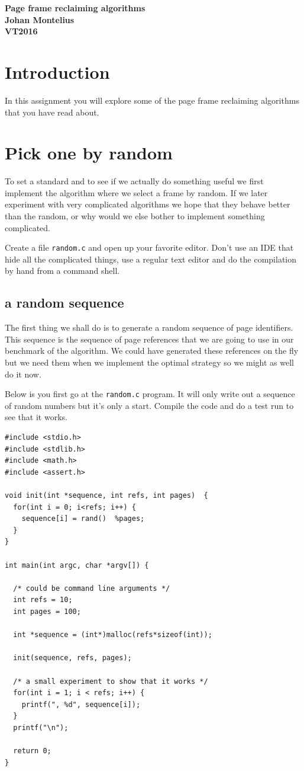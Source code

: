 \documentclass[a4paper,11pt]{article}
\newcommand{\nnsection}[1]{
\section*{#1} \addcontentsline{toc}{section}{#1} }
\begin{document}
\begin{center} \vspace{20pt} \textbf{\large Page frame reclaiming algorithms}\\
\vspace{10pt} \textbf{Johan Montelius}\\ \vspace{10pt} \textbf{VT2016}
\end{center}

\nnsection{Introduction}

In this assignment you will explore some of the page frame reclaiming
algorithms that you have read about.

\section{Pick one by random}

To set a standard and to see if we actually do something useful we
first implement the algorithm where we select a frame by random. If we
later experiment with very complicated algorithms we hope that they
behave better than the random, or why would we else bother to implement
something complicated.

Create a file {\tt random.c} and open up your favorite editor. Don't
use an IDE that hide all the complicated things, use a regular text
editor and do the compilation by hand from a command shell. 

\subsection{a random sequence}

The first thing we shall do is to generate a random sequence of page
identifiers. This sequence is the sequence of page references that we
are going to use in our benchmark of the algorithm. We could have
generated these references on the fly but we need them when we
implement the optimal strategy so we might as well do it now. 

Below is you first go at the {\tt random.c} program. It will only
write out a sequence of random numbers but it's only a start.  Compile
the code and do a test run to see that it works.


\begin{lstlisting}
#include <stdio.h>
#include <stdlib.h>
#include <math.h>
#include <assert.h>

void init(int *sequence, int refs, int pages)  {
  for(int i = 0; i<refs; i++) {
    sequence[i] = rand()  %pages;
  }
}

int main(int argc, char *argv[]) {

  /* could be command line arguments */
  int refs = 10;
  int pages = 100;
  
  int *sequence = (int*)malloc(refs*sizeof(int));

  init(sequence, refs, pages);

  /* a small experiment to show that it works */
  for(int i = 1; i < refs; i++) {
    printf(", %d", sequence[i]);
  }
  printf("\n");  

  return 0;
}
\end{lstlisting}
\end{document}
